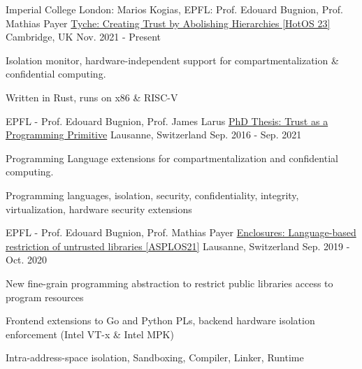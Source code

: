 \begin{cventries}

\cventry
{Imperial College London: Marios Kogias, EPFL: Prof. Edouard Bugnion, Prof. Mathias Payer}
  {\href{https://aghosn.github.io/assets/pdf/tyche_aghosn.pdf}{Tyche: Creating Trust by Abolishing Hierarchies [HotOS 23]}}
{Cambridge, UK}
{Nov. 2021 - Present}
{ %
	\begin{cvitems}
  \item{Isolation monitor, hardware-independent support for compartmentalization \& confidential computing.}
  \item{Written in Rust, runs on x86 \& RISC-V}
	\end{cvitems}
}



\cventry
{EPFL - Prof. Edouard Bugnion, Prof. James Larus}
  {\href{https://infoscience.epfl.ch/record/289120}{PhD Thesis: Trust as a Programming Primitive}}
{Lausanne, Switzerland}
{Sep. 2016  - Sep. 2021}
{
	\begin{cvitems}
  \item{Programming Language extensions for compartmentalization and confidential computing.}
  \item{Programming languages, isolation, security, confidentiality, integrity, virtualization, hardware security extensions}
	\end{cvitems}
}


\cventry
{EPFL - Prof. Edouard Bugnion, Prof. Mathias Payer}
  {\href{https://aghosn.github.io/assets/pdf/enclosure_aghosn.pdf}{Enclosures: Language-based restriction of untrusted libraries [ASPLOS21]}}
{Lausanne, Switzerland}
{Sep. 2019  - Oct. 2020}
{
	\begin{cvitems}
  \item{New fine-grain programming abstraction to restrict public libraries access to program resources}
  \item{Frontend extensions to Go and Python PLs, backend hardware isolation enforcement (Intel VT-x \& Intel MPK)}
  \item{Intra-address-space isolation, Sandboxing, Compiler, Linker, Runtime}
	\end{cvitems}
}


\end{cventries}
